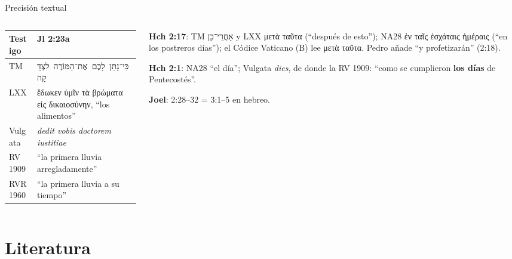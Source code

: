 \documentclass[hyperref={bookmarks=false},aspectratio=169]{beamer}
\newcommand{\heb}[1]{\mbox{\foreignlanguage{hebrew}{#1}}}
\newcommand{\grc}[1]{\foreignlanguage{ancientgreek}{#1}}
\newcommand{\destacar}[1]{\textbf{\textcolor{tierraroja}{#1}}}
\begin{document}
\begin{frame}{Precisión textual}
\begin{columns}[t,onlytextwidth]
\begin{column}{0.53\textwidth}
\scriptsize\renewcommand{\arraystretch}{1.12}
\begin{tabular}{@{}L{1.3cm}L{4.9cm}@{}}
\toprule
\textbf{Testigo} & \textbf{Jl 2:23a} \\ \midrule
TM & \heb{כִּי־נָתַן לָכֶם אֶת־הַמּוֹרֶה לִצְדָקָה} \\
LXX & \grc{ἔδωκεν ὑμῖν τὰ βρώματα εἰς δικαιοσύνην}, ``los alimentos'' \\
Vulgata & \emph{dedit vobis doctorem iustitiae} \\
RV 1909 & ``la primera lluvia arregladamente'' \\
RVR1960 & ``la primera lluvia a su tiempo'' \\
\bottomrule
\end{tabular}
\end{column}
\begin{column}{0.45\textwidth}\scriptsize\RaggedRight
\textbf{Hch 2:17}: TM \heb{אַחֲרֵי־כֵן} y LXX \grc{μετὰ ταῦτα} (``después de esto''); NA28 \grc{ἐν ταῖς ἐσχάταις ἡμέραις} (``en los postreros días''); el Códice Vaticano (B) lee \grc{μετὰ ταῦτα}. Pedro añade ``y profetizarán'' (2:18).\par\smallskip
\textbf{Hch 2:1}: NA28 ``el día''; Vulgata \emph{dies}, de donde la RV 1909: ``como se cumplieron \destacar{los días} de Pentecostés''.\par\smallskip
\textbf{Joel}: 2:28--32 = 3:1--5 en hebreo.
\end{column}
\end{columns}
\end{frame}

\section{Literatura}
\end{document}
